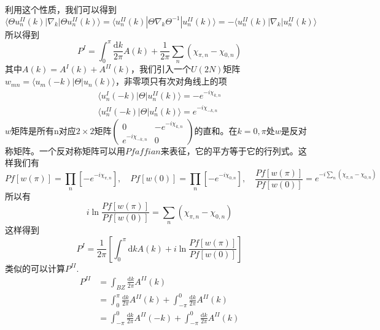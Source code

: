\documentclass{article}
\numberwithin{equation}{subsection}
\begin{document}
利用这个性质，我们可以得到
\begin{equation}
    \langle\Theta u_n^{II}(k)|\nabla_k|\Theta u_n^{II}(k)\rangle=\langle u_n^{II}(k)|\Theta\nabla_k\Theta^{-1}|u_n^{II}(k)\rangle=-\langle u_n^{II}(k)|\nabla_k|u_n^{II}(k)\rangle
\end{equation}
所以得到
\begin{equation}
    P^I=\int_0^\pi\frac{\mathrm{d}k}{2\pi}A(k)+\frac{1}{2\pi}\sum_n(\chi_{\pi,n}-\chi_{0,n})
\end{equation}
其中$A(k)=A^I(k)+A^{II}(k)$，我们引入一个$U(2N)$矩阵$w_{mn}=\langle u_m(-k)|\Theta|u_n(k)\rangle$，非零项只有次对角线上的项
\begin{equation}
    \begin{split}
        \langle u_n^I(-k)|\Theta|u_n^{II}(k)\rangle=-e^{-i\chi_{k,n}}\\
        \langle u_n^{II}(-k)|\Theta|u_n^I(k)\rangle=e^{-i\chi_{-k,n}}
    \end{split}
\end{equation}
$w$矩阵是所有n对应$2\times 2$矩阵$\begin{pmatrix}
    0&-e^{-i\chi_{k,n}}\\
    e^{-i\chi_{-k,n}}&0
\end{pmatrix}$的直和。在$k=0,\pi$处$w$是反对称矩阵。一个反对称矩阵可以用$Pfaffian$来表征，它的平方等于它的行列式。这样我们有
\begin{equation}
    Pf[w(\pi)]=\prod_{n}[-e^{-i\chi_{\pi,n}}],\quad Pf[w(0)]=\prod_{n}[-e^{-i\chi_{0,n}}],\quad\frac{Pf[w(\pi)]}{Pf[w(0)]}=e^{-i\sum_{n}(\chi_{\pi,n}-\chi_{0,n})}
\end{equation}
所以有
\begin{equation}
    i\ln\frac{Pf[w(\pi)]}{Pf[w(0)]}=\sum_{n}(\chi_{\pi,n}-\chi_{0,n})
\end{equation}
这样得到
\begin{equation}
    P^I=\frac{1}{2\pi}\left[\int_{0}^{\pi}\mathrm{d}k A(k)+i\ln\frac{Pf[w(\pi)]}{Pf[w(0)]}\right]
\end{equation}
类似的可以计算$P^{II}$.
\begin{equation}
    \begin{split}
        P^{II}&=\int_{BZ}\frac{\mathrm{d}k}{2\pi}A^{II}(k)\\
        &=\int_{0}^{\pi}\frac{\mathrm{d}k}{2\pi}A^{II}(k)+\int_{-\pi}^{0}\frac{\mathrm{d}k}{2\pi}A^{II}(k)\\
        &=\int_{-\pi}^{0}\frac{\mathrm{d}k}{2\pi}A^{II}(-k)+\int_{-\pi}^{0}\frac{\mathrm{d}k}{2\pi}A^{II}(k)
    \end{split}
\end{equation}
\end{document}
